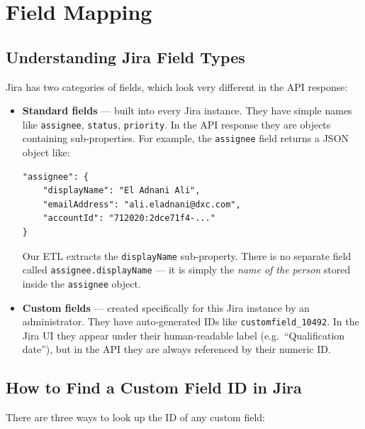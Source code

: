 \documentclass[12pt, a4paper]{article}
\begin{document}
\section{Field Mapping}

\subsection{Understanding Jira Field Types}

Jira has two categories of fields, which look very different in the API response:

\begin{itemize}
    \item \textbf{Standard fields} — built into every Jira instance. They have simple names
          like \texttt{assignee}, \texttt{status}, \texttt{priority}. In the API response
          they are objects containing sub-properties. For example, the \texttt{assignee}
          field returns a JSON object like:
          \begin{lstlisting}[style=json]
"assignee": {
    "displayName": "El Adnani Ali",
    "emailAddress": "ali.eladnani@dxc.com",
    "accountId": "712020:2dce71f4-..."
}
          \end{lstlisting}
          Our ETL extracts the \texttt{displayName} sub-property. There is no separate field
          called \texttt{assignee.displayName} — it is simply the \textit{name of the person}
          stored inside the \texttt{assignee} object.

    \item \textbf{Custom fields} — created specifically for this Jira instance by an
          administrator. They have auto-generated IDs like \texttt{customfield\_10492}.
          In the Jira UI they appear under their human-readable label (e.g.\ ``Qualification
          date''), but in the API they are always referenced by their numeric ID.
\end{itemize}

\subsection{How to Find a Custom Field ID in Jira}

There are three ways to look up the ID of any custom field:
\end{document}
